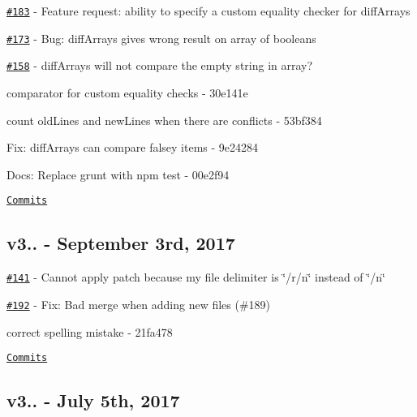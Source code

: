 \begin{DoxyItemize}
\item \href{https://github.com/kpdecker/jsdiff/issues/183}{\tt \#183} -\/ Feature request\+: ability to specify a custom equality checker for {\ttfamily diff\+Arrays}
\item \href{https://github.com/kpdecker/jsdiff/issues/173}{\tt \#173} -\/ Bug\+: diff\+Arrays gives wrong result on array of booleans
\item \href{https://github.com/kpdecker/jsdiff/issues/158}{\tt \#158} -\/ diff\+Arrays will not compare the empty string in array?
\item comparator for custom equality checks -\/ 30e141e
\item count old\+Lines and new\+Lines when there are conflicts -\/ 53bf384
\item Fix\+: diff\+Arrays can compare falsey items -\/ 9e24284
\item Docs\+: Replace grunt with npm test -\/ 00e2f94
\end{DoxyItemize}

\href{https://github.com/kpdecker/jsdiff/compare/v3.3.1...v3.4.0}{\tt Commits}

\subsection*{v3.. -\/ September 3rd, 2017}


\begin{DoxyItemize}
\item \href{https://github.com/kpdecker/jsdiff/issues/141}{\tt \#141} -\/ Cannot apply patch because my file delimiter is \char`\"{}/r/n\char`\"{} instead of \char`\"{}/n\char`\"{}
\item \href{https://github.com/kpdecker/jsdiff/pull/192}{\tt \#192} -\/ Fix\+: Bad merge when adding new files (\#189)
\item correct spelling mistake -\/ 21fa478
\end{DoxyItemize}

\href{https://github.com/kpdecker/jsdiff/compare/v3.3.0...v3.3.1}{\tt Commits}

\subsection*{v3.. -\/ July 5th, 2017}


